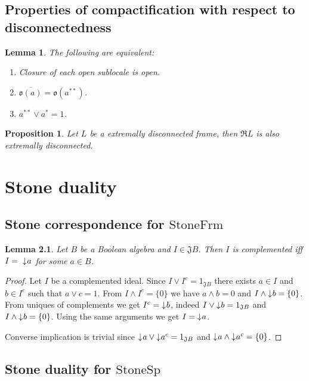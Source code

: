 \documentclass[12pt,a4paper,fleqn]{report}
\newcounter{thmCounter}[section]
\theoremstyle{newthmstyle}
\newtheorem{lemma}[thmCounter]{Lemma}
\newtheorem{proposition}[thmCounter]{Proposition}
\theoremstyle{newthmstyleNormal}
\newcommand\StoneFrm{\ensuremath{\mathrm{StoneFrm}}}
\newcommand\StoneSp{\ensuremath{\mathrm{StoneSp}}}
\newcommand\R{\ensuremath{\mathfrak{R}}}
\newcommand\J{\ensuremath{\mathfrak{J}}}
\newcommand\closure[1]{\overline{#1}}
\newcommand\downset{\mathord{\downarrow}\mkern1mu} %
\begin{document}
\section{Properties of compactification with respect to disconnectedness}
\begin{lemma}
    The following are equivalent:

    \begin{enumerate}
        \item Closure of each open sublocale is open.
        \item $\closure{\mathfrak{o}(a)} = \mathfrak{o}(a^{**})$.
        \item $a^{**} \vee a^* = 1$.
    \end{enumerate}
\end{lemma}

\begin{proposition}
    Let $L$ be a extremally disconnected frame, then $\R L$ is also extremally disconnected.
\end{proposition}

\chapter{Stone duality}
\section{Stone correspondence for \StoneFrm}
\begin{lemma}
    Let $B$ be a Boolean algebra and $I \in \J B$. Then $I$ is complemented iff $I =\;\downset a$ for some $a \in B$.
\end{lemma}
\begin{proof}
    Let $I$ be a complemented ideal. Since $I \vee I^c = 1_{\J B}$ there exists $a \in I$ and $b \in I^c$ such that $a \vee c = 1$. From $I \wedge I^c = \{0\}$ we have $a \wedge b = 0$ and $I \wedge \downset b = \{0\}$.
    From uniques of complements we get $I^c = \downset b$, indeed $I \vee \downset b = 1_{\J B}$ and $I \wedge \downset b = \{0\}$. Using the same arguments we get $I = \downset a$.

    Converse implication is trivial since $\downset a \vee \downset a^c = 1_{\J B}$ and $\downset a \wedge \downset a^c = \{0\}$.
\end{proof}

\section{Stone duality for \StoneSp} %
\end{document}
